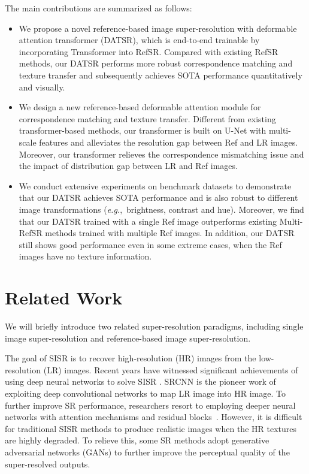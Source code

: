 \documentclass[runningheads]{llncs}
\def\eg{\mbox{\textit{e.g.}, }}
\begin{document}
The main contributions are summarized as follows:
\begin{itemize}
\setlength{\itemsep}{5pt}
\item We propose a novel reference-based image super-resolution with deformable attention transformer (DATSR), which is end-to-end trainable by incorporating Transformer into RefSR. Compared with existing RefSR methods, our DATSR performs more robust correspondence matching and texture transfer and subsequently achieves SOTA performance quantitatively and visually. 
\item We design a new reference-based deformable attention module for correspondence matching and texture transfer.
Different from existing transformer-based methods, our transformer is built on U-Net with multi-scale features and alleviates the resolution gap between Ref and LR images.
Moreover, our transformer relieves the correspondence mismatching issue and the impact of distribution gap between LR and Ref images.
\item We conduct extensive experiments on benchmark datasets to demonstrate that our DATSR achieves SOTA performance and is also robust to different image transformations (\eg brightness, contrast and hue). 
Moreover, we find that our DATSR trained with a single Ref image outperforms existing Multi-RefSR methods trained with multiple Ref images. 
In addition, our DATSR still shows good performance even in some extreme cases, when the Ref images have no texture information.
\end{itemize}


\section{Related Work}
We will briefly introduce two related super-resolution paradigms, including single image super-resolution and reference-based image super-resolution.

The goal of SISR is to recover high-resolution (HR) images from the low-resolution (LR) images. 
Recent years have witnessed significant achievements of using deep neural networks to solve SISR \cite{dong2015image,zhang2018image}.
SRCNN \cite{dong2015image} is the pioneer work of exploiting deep convolutional networks to map LR image into HR image.
To further improve SR performance, researchers resort to employing deeper neural networks with attention mechanisms and residual blocks~\cite{lim2017enhanced,sajjadi2017enhancenet,zhang2018image,liang2021swinir,Mei_2021_CVPR,liang2021hierarchical,Zhang_2021_CVPR,Liu_2020_CVPR,liang2021mutual,zhang2021designing,Song_2020_CVPR,Dai_2019_CVPR}. 
However, it is difficult for traditional SISR methods to produce realistic images when the HR textures are highly degraded.
To relieve this, some SR methods \cite{ledig2017photo,wang2018esrgan,zhang2019ranksrgan,Hui_2021_CVPR,Wang_2020_CVPR,wang2021real,zhou2019kernel} adopt generative adversarial networks (GANs) to further improve the perceptual quality of the super-resolved outputs.
\end{document}
